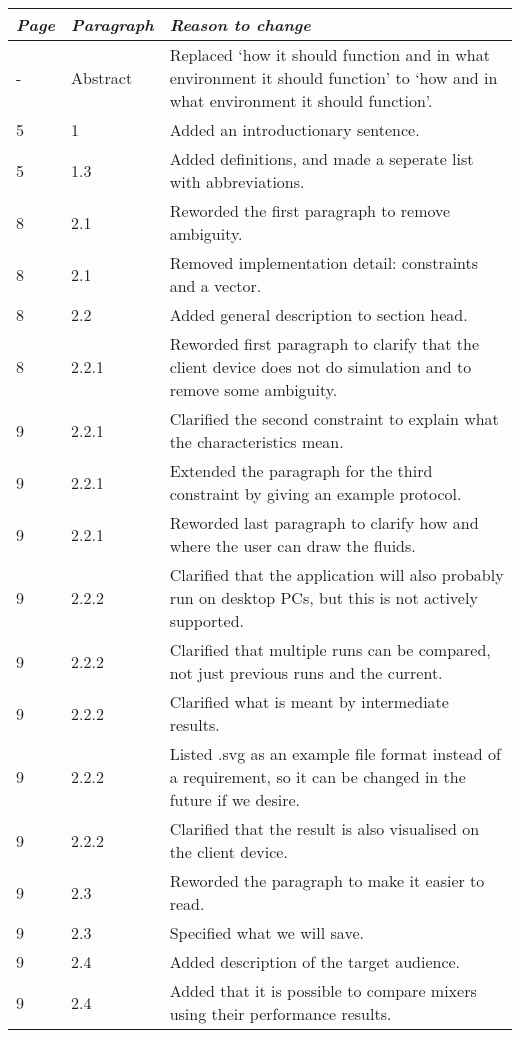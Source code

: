 \begin{longtable}{|l|l|p{11cm}|}
    \hline
    \emph{Page} &   \emph{Paragraph}    &   \emph{Reason to change}\\
    \hline
    \endhead
    \hline
    \endfoot
    - & Abstract & Replaced `how it should function and in what environment it should function' to `how and in what environment it should function'.\\
    5 & 1 & Added an introductionary sentence.\\
    5 & 1.3 & Added definitions, and made a seperate list with abbreviations. \\
    8 & 2.1 & Reworded the first paragraph to remove ambiguity. \\
    8 & 2.1 & Removed implementation detail: constraints and a vector. \\
    8 & 2.2 & Added general description to section head. \\
    8 & 2.2.1 & Reworded first paragraph to clarify that the client device does not do simulation and to remove some ambiguity. \\
    9 & 2.2.1 & Clarified the second constraint to explain what the characteristics mean. \\
    9 & 2.2.1 & Extended the paragraph for the third constraint by giving an example protocol. \\
    9 & 2.2.1 & Reworded last paragraph to clarify how and where the user can draw the fluids. \\
    9 & 2.2.2 & Clarified that the application will also probably run on desktop PCs, but this is not actively supported. \\
    9 & 2.2.2 & Clarified that multiple runs can be compared, not just previous runs and the current.\\
    9 & 2.2.2 & Clarified what is meant by intermediate results. \\
    9 & 2.2.2 & Listed .svg as an example file format instead of a requirement, so it can be changed in the future if we desire. \\
    9 & 2.2.2 & Clarified that the result is also visualised on the client device. \\
    9 & 2.3 & Reworded the paragraph to make it easier to read. \\
    9 & 2.3 & Specified what we will save. \\
    9 & 2.4 & Added description of the target audience. \\
    9 & 2.4 & Added that it is possible to compare mixers using their performance results. \\

\end{longtable}
